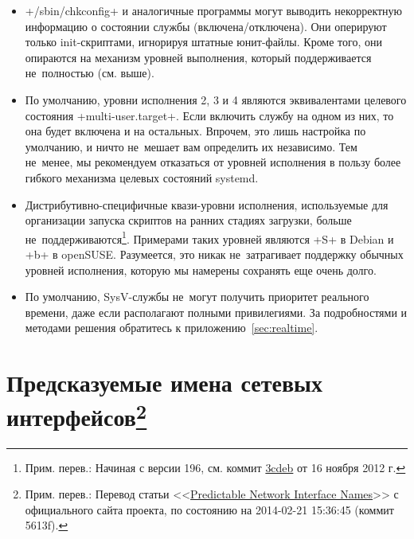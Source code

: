 \documentclass[10pt,oneside,a4paper]{article}
\newcommand{\sfnote}[1]{\texorpdfstring{\protect\footnote%
	{Прим. перев.: #1}}{}}
\begin{document}
\begin{itemize}
		ограничения. Хотя все уровни исполнения SysV имеют
		соответствующие им целевые состояния (target units), далеко
		не~все целевые состояния имеют соответствующие им уровни
		исполнения. Это обусловлено тем, что механизм целевых состояний
		отличается гораздо б\'{о}льшей гибкостью и эффективностью,
		чем система уровней исполнения. Как следствие, в некоторых
		случаях попытка узнать текущий уровень исполнения (например, 
		при помощи +/sbin/runlevel+) может вернуть просто <<+N+>> (т.е.
		<<уровень выполнения неизвестен>>), что приведет к нарушению
		работы скриптов, использующих явную проверку текущего уровня
		исполнения. Избегайте подобных проверок.
	\item +/sbin/chkconfig+ и аналогичные программы могут выводить
		некорректную информацию о состоянии службы (включена/отключена).
		Они оперируют только init-скриптами, игнорируя штатные
		юнит-файлы. Кроме того, они опираются на механизм уровней
		выполнения, который поддерживается не~полностью (см. выше).
	\item По умолчанию, уровни исполнения 2, 3 и 4 являются эквивалентами
		целевого состояния +multi-user.target+. Если включить службу на
		одном из них, то она будет включена и на остальных. Впрочем, это
		лишь настройка по умолчанию, и ничто не~мешает вам определить их
		независимо. Тем не~менее, мы рекомендуем отказаться от уровней
		исполнения в пользу более гибкого механизма целевых состояний
		systemd.
	\item Дистрибутивно-специфичные квази-уровни исполнения, используемые
		для организации запуска скриптов на ранних стадиях загрузки, больше
		не~поддерживаются\footnote{Прим. перев.: Начиная с версии 196,
		см. коммит
		\href{http://cgit.freedesktop.org/systemd/systemd/commit/?id=3cdebc217c42c8529086f2965319b6a48eaaeabe}%
		{3cdeb} от 16 ноября 2012 г.}. Примерами таких уровней являются
		+S+ в Debian и +b+ в openSUSE. Разумеется, это никак
		не~затрагивает поддержку обычных уровней исполнения, которую мы
		намерены сохранять еще очень долго.
	\item По умолчанию, SysV-службы не~могут получить приоритет реального
		времени, даже если располагают полными привилегиями. За
		подробностями и методами решения обратитесь к
		приложению~\ref{sec:realtime}.
\end{itemize}


\section{Предсказуемые имена сетевых интерфейсов\sfnote{Перевод статьи
<<\href{http://www.freedesktop.org/wiki/Software/systemd/PredictableNetworkInterfaceNames}%
{Predictable Network Interface Names}>> с официального сайта проекта, по
состоянию на 2014-02-21 15:36:45 (коммит 5613f).}}
\end{document}
